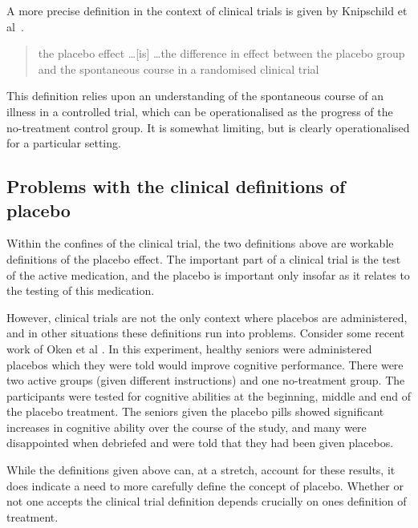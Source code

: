 A more precise definition in the context of clinical trials is given by Knipschild et al~\cite{Knipschild2005}. 

\begin{quote}
   the placebo effect \ldots [is] \ldots the difference in effect between the placebo group and the spontaneous course in a randomised clinical trial 
\end{quote}



This definition relies upon an understanding of the spontaneous course of an illness in a controlled trial, which can be operationalised as the progress of the no-treatment control group. It is somewhat limiting, but is clearly operationalised for a particular setting. %

\subsection{Problems with the clinical definitions of placebo}
\label{sec:plac-cogn-perf}

Within the confines of the clinical trial, the two definitions above are workable definitions of the placebo effect. The important part of a clinical trial is the test of the active medication, and the placebo is important only insofar as it relates to the testing of this medication. 

However, clinical trials are not the only context where placebos are administered, and in other situations these definitions run into problems. Consider some recent work of Oken et al \cite{Oken2008}. In this experiment, healthy seniors were administered placebos which they were told would improve cognitive performance. There were two active groups (given different instructions) and one no-treatment group. The participants were tested for cognitive abilities at the beginning, middle and end of the placebo treatment.  The seniors given the placebo pills showed significant increases in cognitive ability over the course of the study, and many were disappointed when debriefed and were told that they had been given placebos.

While the definitions given above can, at a stretch, account for these results, it does indicate a need to more carefully define the concept of placebo. Whether or not one accepts the clinical trial definition depends crucially on ones definition of treatment. 

